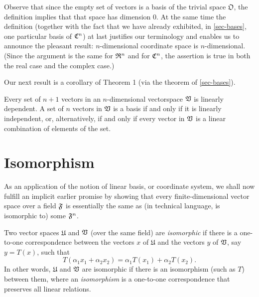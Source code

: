 Observe that since the empty set of vectors is a basis of the trivial space
\(\mathfrak{O}\), the definition implies that that space has dimension \(0\). At
the same time the definition (together with the fact that we have already
exhibited, in \cref{sec-bases}, one particular basis of \(\mathfrak{C}^n\)) at last
justifies our terminology and enables us to announce the pleasant result:
\(n\)-dimensional coordinate space is \(n\)-dimensional. (Since the argument is
the same for \(\mathfrak{R}^n\) and for \(\mathfrak{C}^n\), the assertion is true in both
the real case and the complex case.)

Our next result is a corollary of Theorem 1 (via the theorem of
\cref{sec-bases}).

\begin{theorem}
    Every set of \(n + 1\) vectors in an \(n\)-dimensional vectorspace
    \(\mathfrak{V}\) is linearly dependent. A set of \(n\) vectors in \(\mathfrak{V}\) is a
    basis if and only if it is linearly independent, or, alternatively, if and
    only if every vector in \(\mathfrak{V}\) is a linear combination of elements of
    the set.
\end{theorem}

\section{Isomorphism}\label{sec-isomorphism}

As an application of the notion of linear basis, or coordinate system, we shall
now fulfill an implicit earlier promise by showing that every finite-dimensional
vector space over a field \(\mathfrak{F}\) is essentially the same as (in technical
language, is isomorphic to) some \(\mathfrak{F}^n\).

\begin{definition}
    Two vector spaces \(\mathfrak{U}\) and \(  \mathfrak{V}\) (over the same field)
    are \emph{isomorphic} if there is a one-to-one correspondence between the
    vectors \(x\) of \(\mathfrak{U}\) and the vectors \(y\) of \(  \mathfrak{V}\),
    say \(y = T(x)\), such that
    \begin{equation*}
        T(\alpha_1 x_1 + \alpha_2 x_2) = \alpha_1 T(x_1) + \alpha_2 T(x_2).
    \end{equation*}
    In other words, \(\mathfrak{U}\) and \(  \mathfrak{V}\)  are isomorphic if there
    is an isomorphism (such as \(T\)) between them, where an \emph{isomorphism}
    is a one-to-one correspondence that preserves all linear relations.
\end{definition}

